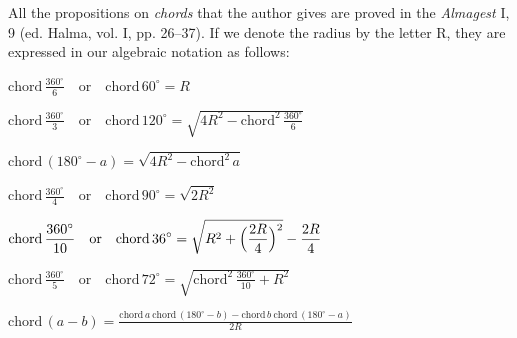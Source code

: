 \documentclass[11pt]{article}
\begin{document}
\par All the propositions on \emph{chords} that the author gives are proved in the \emph{Almagest} I, 9 (ed. Halma, vol. I, pp. 26–37). If we denote the radius by the letter R, they are expressed in our algebraic notation as follows:\par
\par\smallskip\par\noindent\hspace*{1.5em}$\displaystyle \text{chord}\,\frac{360^\circ}{6} \quad\text{or}\quad \text{chord}\,60^\circ = R$\par
\par\noindent\hspace*{1.5em}$\displaystyle \text{chord}\,\frac{360^\circ}{3} \quad\text{or}\quad \text{chord}\,120^\circ = \sqrt{4R^2 - \text{chord}^2\,\frac{360^\circ}{6}}$\par
\par\noindent\hspace*{1.5em}$\displaystyle \text{chord}\,(180^\circ - a) = \sqrt{4R^2 - \text{chord}^2\,a}$\par
\par\noindent\hspace*{1.5em}$\displaystyle \text{chord}\,\frac{360^\circ}{4} \quad\text{or}\quad \text{chord}\,90^\circ = \sqrt{2R^2}$\par
\par\noindent\hspace*{1.5em}$\displaystyle \text{chord}\,\frac{360^\circ}{10} \quad\text{or}\quad \text{chord}\,36^\circ = \sqrt{R^2 + \Bigl(\frac{2R}{4}\Bigr)^2} - \frac{2R}{4}$\par
\par\noindent\hspace*{1.5em}$\displaystyle \text{chord}\,\frac{360^\circ}{5} \quad\text{or}\quad \text{chord}\,72^\circ = \sqrt{\text{chord}^2\,\frac{360^\circ}{10} + R^2}$\par
\par\noindent\hspace*{1.5em}$\displaystyle \text{chord}\,(a - b) = \frac{\text{chord}\,a\ \text{chord}\,(180^\circ - b) - \text{chord}\,b\ \text{chord}\,(180^\circ - a)}{2R}$\par
\end{document}
